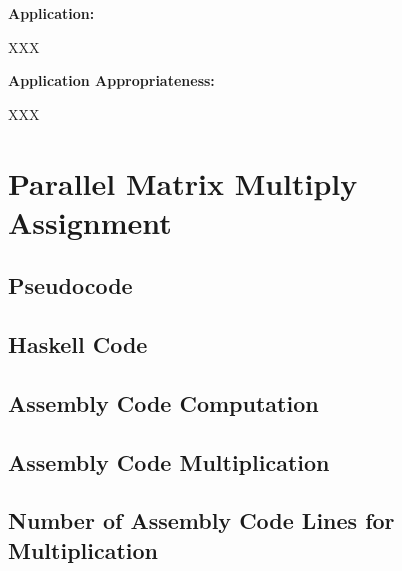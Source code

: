 \documentclass[hidelinks,12pt]{article}
\begin{document}
\begin{addmargin}[1cm]{0em}%
\textbf{Application:}
	\begin{addmargin}[1cm]{0em}%
		XXX
	\end{addmargin}
\end{addmargin}

\begin{addmargin}[1cm]{0em}%
\textbf{Application Appropriateness:}
	\begin{addmargin}[1cm]{0em}%
		XXX
	\end{addmargin}
\end{addmargin}

\section{Parallel Matrix Multiply Assignment}
\subsection{Pseudocode}
\subsection{Haskell Code}
\subsection{Assembly Code Computation}
\subsection{Assembly Code Multiplication}
\subsection{Number of Assembly Code Lines for Multiplication}
\end{document}

